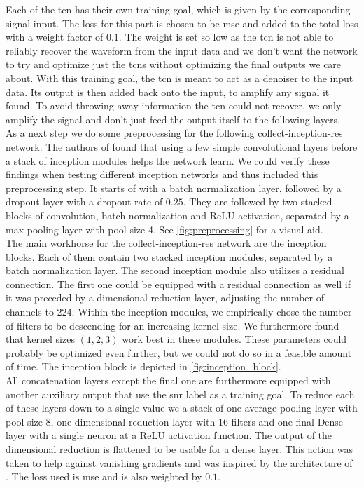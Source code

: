 Each of the \gls{tcn} has their own training goal, which is given by the corresponding signal input. The loss for this part is chosen to be \gls{mse} and added to the total loss with a weight factor of $0.1$. The weight is set so low as the \gls{tcn} is not able to reliably recover the waveform from the input data and we don't want the network to try and optimize just the \gls{tcn}s without optimizing the final outputs we care about. With this training goal, the \gls{tcn} is meant to act as a denoiser to the input data. Its output is then added back onto the input, to amplify any signal it found. To avoid throwing away information the \gls{tcn} could not recover, we only amplify the signal and don't just feed the output itself to the following layers.\\
As a next step we do some preprocessing for the following collect-inception-res network. The authors of \cite{inception_module} found that using a few simple convolutional layers before a stack of inception modules helps the network learn. We could verify these findings when testing different inception networks and thus included this preprocessing step. It starts of with a batch normalization layer, followed by a dropout layer with a dropout rate of $0.25$. They are followed by two stacked blocks of convolution, batch normalization and ReLU activation, separated by a max pooling layer with pool size 4. See \autoref{fig:preprocessing} for a visual aid.\\
The main workhorse for the collect-inception-res network are the inception blocks. Each of them contain two stacked inception modules, separated by a batch normalization layer. The second inception module also utilizes a residual connection. The first one could be equipped with a residual connection as well if it was preceded by a  dimensional reduction layer, adjusting the number of channels to $224$. Within the inception modules, we empirically chose the number of filters to be descending for an increasing kernel size. We furthermore found that kernel sizes $(1,2,3)$ work best in these modules. These parameters could probably be optimized even further, but we could not do so in a feasible amount of time. The inception block is depicted in \autoref{fig:inception_block}.\\
All concatenation layers except the final one are furthermore equipped with another auxiliary output that use the \gls{snr} label as a training goal. To reduce each of these layers down to a single value we a stack of one average pooling layer with pool size 8, one dimensional reduction layer with 16 filters and one final Dense layer with a single neuron at a ReLU activation function. The output of the dimensional reduction is flattened to be usable for a dense layer. This action was taken to help against vanishing gradients and was inspired by the architecture of \cite{inception_module}. The loss used is \gls{mse} and is also weighted by $0.1$.\\
